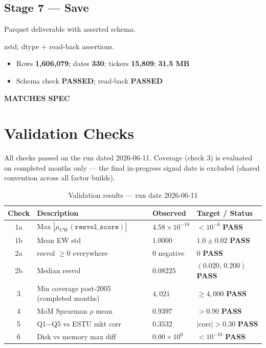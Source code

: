 \documentclass[11pt,a4paper]{article}
\newcommand{\PASS}[1]{\textcolor{pass}{\textbf{#1}}}
\begin{document}
\subsection{Stage 7 --- Save}

\begin{description}[style=nextline]
  \item[PDF SPEC] Parquet deliverable with asserted schema.
  \item[Implementation] zstd; dtype + read-back assertions.
  \item[Observed]\phantom{x}
    \begin{itemize}[nosep, topsep=-\parskip]
      \item Rows \textbf{1{,}606{,}079}; dates \textbf{330}; tickers \textbf{15{,}809}; \textbf{31.5 MB}
      \item Schema check \PASS{PASSED}; read-back \PASS{PASSED}
    \end{itemize}
  \item[Status] \PASS{MATCHES SPEC}
\end{description}

\section{Validation Checks}

All checks passed on the run dated 2026-06-11. Coverage (check 3) is evaluated
on completed months only --- the final in-progress signal date is excluded
(shared convention across all factor builds).

\begin{table}[h!]
\centering
\caption{Validation results --- run date 2026-06-11}
\small
\begin{tabular}{clll}
\toprule
\textbf{Check} & \textbf{Description} & \textbf{Observed} & \textbf{Target / Status} \\
\midrule
1a & Max $|\mu_{\text{CW}}(\texttt{resvol\_score})|$ & $4.58\times10^{-16}$ & $<10^{-6}$ \quad \PASS{PASS} \\
1b & Mean EW std & $1.0000$ & $1.0\pm0.02$ \quad \PASS{PASS} \\
2a & resvol $\geq 0$ everywhere & 0 negative & 0 \quad \PASS{PASS} \\
2b & Median resvol & $0.08225$ & $(0.020,\,0.200)$ \quad \PASS{PASS} \\
3 & Min coverage post-2005 (completed months) & $4{,}021$ & $\geq4{,}000$ \quad \PASS{PASS} \\
4 & MoM Spearman $\rho$ mean & $0.9397$ & $>0.90$ \quad \PASS{PASS} \\
5 & Q1$-$Q5 vs ESTU mkt corr & $0.3532$ & $|\text{corr}|>0.30$ \quad \PASS{PASS} \\
6 & Disk vs memory max diff & $0.00\times10^{0}$ & $<10^{-10}$ \quad \PASS{PASS} \\
\bottomrule
\end{tabular}
\end{table}
\end{document}
